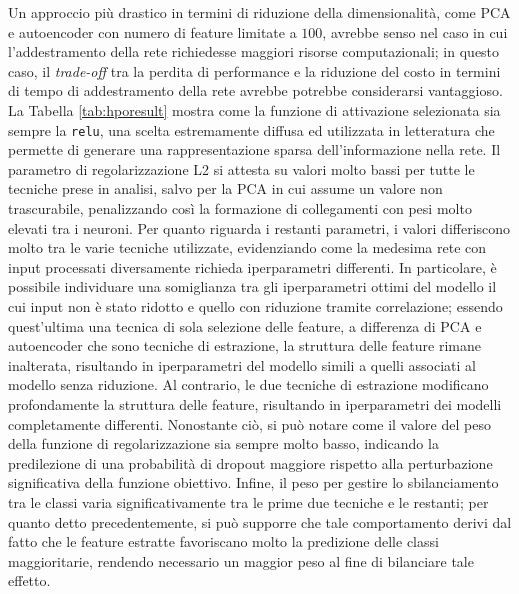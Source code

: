 Un approccio più drastico in termini di riduzione della dimensionalità, come PCA e autoencoder con numero di feature limitate a $100$, avrebbe senso nel caso in cui l'addestramento della rete richiedesse maggiori risorse computazionali; in questo caso, il \textit{trade-off} tra la perdita di performance e la riduzione del costo in termini di tempo di addestramento della rete avrebbe potrebbe considerarsi vantaggioso.
La Tabella \ref{tab:hporesult} mostra come la funzione di attivazione selezionata sia sempre la \texttt{relu}, una scelta estremamente diffusa ed utilizzata in letteratura che permette di generare una rappresentazione sparsa dell'informazione nella rete. 
Il parametro di regolarizzazione L2 si attesta su valori molto bassi per tutte le tecniche prese in analisi, salvo per la PCA in cui assume un valore non trascurabile, penalizzando così la formazione di collegamenti con pesi molto elevati tra i neuroni. 
Per quanto riguarda i restanti parametri, i valori differiscono molto tra le varie tecniche utilizzate, evidenziando come la medesima rete con input processati diversamente richieda iperparametri differenti. 
In particolare, è possibile individuare una somiglianza tra gli iperparametri ottimi del modello il cui input non è stato ridotto e quello con riduzione tramite correlazione; essendo quest'ultima una tecnica di sola selezione delle feature, a differenza di PCA e autoencoder che sono tecniche di estrazione, la struttura delle feature rimane inalterata, risultando in iperparametri del modello simili a quelli associati al modello senza riduzione. 
Al contrario, le due tecniche di estrazione modificano profondamente la struttura delle feature, risultando in iperparametri dei modelli completamente differenti.
Nonostante ciò, si può notare come il valore del peso della funzione di regolarizzazione sia sempre molto basso, indicando la predilezione di una probabilità di dropout maggiore rispetto alla perturbazione significativa della funzione obiettivo.
Infine, il peso per gestire lo sbilanciamento tra le classi varia significativamente tra le prime due tecniche e le restanti; per quanto detto precedentemente, si può supporre che tale comportamento derivi dal fatto che le feature estratte favoriscano molto la predizione delle classi maggioritarie, rendendo necessario un maggior peso al fine di bilanciare tale effetto.

